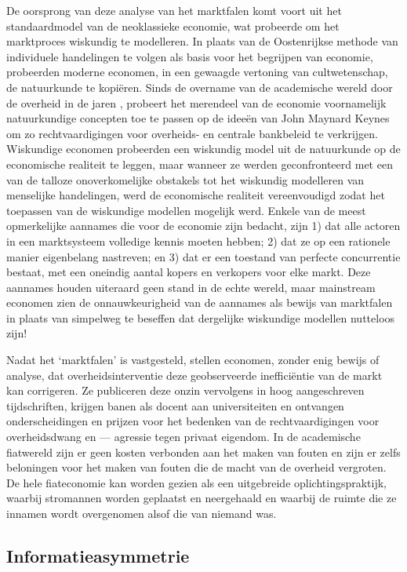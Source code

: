 De oorsprong van deze analyse van het marktfalen komt voort uit het standaardmodel van de neoklassieke economie, wat probeerde om het marktproces wiskundig te modelleren. In plaats van de Oostenrijkse methode van individuele handelingen te volgen als basis voor het begrijpen van economie, probeerden moderne economen, in een gewaagde vertoning van cultwetenschap, de natuurkunde te kopiëren. Sinds de overname van de academische wereld door de overheid in de jaren , probeert het merendeel van de economie voornamelijk natuurkundige concepten toe te passen op de ideeën van John Maynard Keynes om zo rechtvaardigingen voor overheids- en centrale bankbeleid te verkrijgen. Wiskundige economen probeerden een wiskundig model uit de natuurkunde op de economische realiteit te leggen, maar wanneer ze werden geconfronteerd met een van de talloze onoverkomelijke obstakels tot het wiskundig modelleren van menselijke handelingen, werd de economische realiteit vereenvoudigd zodat het toepassen van de wiskundige modellen mogelijk werd. Enkele van de meest opmerkelijke aannames die voor de economie zijn bedacht, zijn 1) dat alle actoren in een marktsysteem volledige kennis moeten hebben; 2) dat ze op een rationele manier eigenbelang nastreven; en 3) dat er een toestand van perfecte concurrentie bestaat, met een oneindig aantal kopers en verkopers voor elke markt. Deze aannames houden uiteraard geen stand in de echte wereld, maar mainstream economen zien de onnauwkeurigheid van de aannames als bewijs van marktfalen in plaats van simpelweg te beseffen dat dergelijke wiskundige modellen nutteloos zijn!

Nadat het `marktfalen' is vastgesteld, stellen economen, zonder enig bewijs of analyse, dat overheidsinterventie deze geobserveerde inefficiëntie van de markt kan corrigeren. Ze publiceren deze onzin vervolgens in hoog aangeschreven tijdschriften, krijgen banen als docent aan universiteiten en ontvangen onderscheidingen en prijzen voor het bedenken van de rechtvaardigingen voor overheidsdwang en --- agressie tegen privaat eigendom. In de academische fiatwereld zijn er geen kosten verbonden aan het maken van fouten en zijn er zelfs beloningen voor het maken van fouten die de macht van de overheid vergroten.\autocite{185} De hele fiateconomie kan worden gezien als een uitgebreide oplichtingspraktijk, waarbij stromannen worden geplaatst en neergehaald en waarbij de ruimte die ze innamen wordt overgenomen alsof die van niemand was.

\subsection{Informatieasymmetrie}


